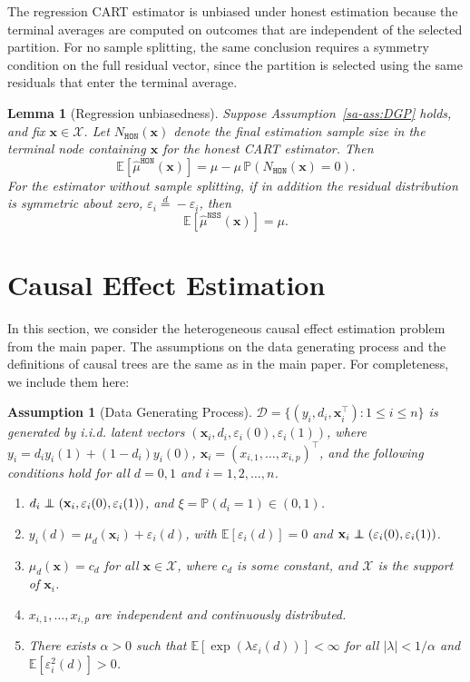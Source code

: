 \documentclass[10pt]{article}
\newcommand\independent{\protect\mathpalette{\protect\independenT}{\perp}}
\def\independenT#1#2{\mathrel{\rlap{$#1#2$}\mkern2mu{#1#2}}}
\def\bx{\mathbf{x}}
\def\E{\mathbb{E}}
\def\P{\mathbb{P}}
\newtheorem{assumption}{Assumption}
\newtheorem{lemma}[theorem]{Lemma}
\theoremstyle{definition}
\theoremstyle{remark}
\begin{document}
The regression CART estimator is unbiased under honest estimation because the terminal averages are computed on outcomes that are independent of the selected partition. For no sample splitting, the same conclusion requires a symmetry condition on the full residual vector, since the partition is selected using the same residuals that enter the terminal average.

\begin{lemma}[Regression unbiasedness]\label{sa-lem:reg-unbiased}
Suppose Assumption~\ref{sa-ass:DGP} holds, and fix $\bx\in\mathcal X$. Let $N_{\mathtt{HON}}(\bx)$ denote the final estimation sample size in the terminal node containing $\bx$ for the honest CART estimator. Then
\[
    \E[\hat\mu^{\mathtt{HON}}(\bx)]
    =
    \mu-\mu\,\P(N_{\mathtt{HON}}(\bx)=0).
\]
For the estimator without sample splitting, if in addition the residual distribution is symmetric about zero, $\varepsilon_i\stackrel{d}{=}-\varepsilon_i$, then
\[
    \E[\hat\mu^{\mathtt{NSS}}(\bx)] = \mu.
\]
\end{lemma}

\section{Causal Effect Estimation}\label{sa-sec:causal}

In this section, we consider the heterogeneous causal effect estimation problem from the main paper. The assumptions on the data generating process and the definitions of causal trees are the same as in the main paper. For completeness, we include them here:



\begin{assumption}[Data Generating Process]\label{sa-assump: dgp-causal}
    $\mathcal{D} = \{(y_i,d_i,\bx^\top_i): 1 \leq i \leq n\}$ is generated by i.i.d. latent vectors $(\bx_i,d_i,\varepsilon_i(0),\varepsilon_i(1))$, where $y_i = d_i y_i(1) + (1 - d_i) y_i(0)$, $\bx_i = (x_{i,1}, \ldots, x_{i,p})^{\top}$, and the following conditions hold for all $d = 0,1$ and $i = 1,2, \ldots, n$.
    \begin{enumerate}
        \item $d_i \independent (\bx_i,\varepsilon_i(0),\varepsilon_i(1))$, and $\xi = \P(d_i = 1) \in (0,1)$.
        \item $y_i(d) = \mu_d(\bx_i) + \varepsilon_i(d)$, with $\E[\varepsilon_i(d)]=0$ and $\bx_i \independent (\varepsilon_i(0),\varepsilon_i(1))$.
        \item $\mu_d(\bx) = c_d$ for all $\bx \in \mathcal{X}$, where $c_d$ is some constant, and $\mathcal{X}$ is the support of $\bx_i$.
        \item $x_{i,1}, \ldots, x_{i,p}$ are independent and continuously distributed. 
        \item There exists $\alpha > 0$ such that $\E[\exp(\lambda\varepsilon_i(d))] < \infty$ for all $|\lambda| < 1/\alpha$ and $\E[\varepsilon_i^2(d)] > 0$. 
    \end{enumerate}
\end{assumption}
\end{document}
